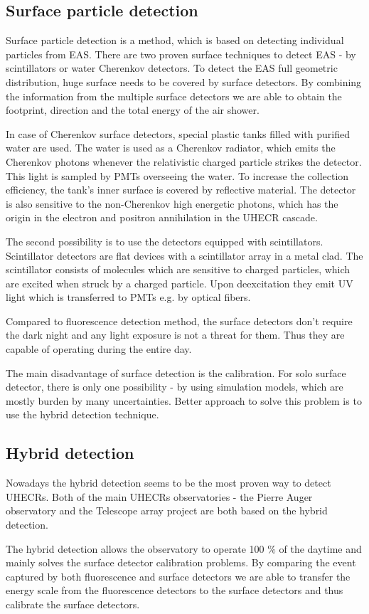 \subsection{Surface particle detection}
Surface particle detection is a method, which is based on detecting individual particles from EAS. There are two proven surface techniques to detect EAS - by scintillators or water Cherenkov detectors. To detect the EAS full geometric distribution, huge surface needs to be covered by surface detectors. By combining the information from the multiple surface detectors we are able to obtain the footprint, direction and the total energy of the air shower.
\par
In case of Cherenkov surface detectors, special plastic tanks filled with purified water are used. The water is used as a Cherenkov radiator, which emits the Cherenkov photons whenever the relativistic charged particle strikes the detector. This light is sampled by PMTs overseeing the water.
To increase the collection efficiency, the tank's inner surface is covered by reflective material. The detector is also sensitive to the non-Cherenkov high energetic photons, which has the origin in the electron and positron annihilation in the UHECR cascade.
\par
The second possibility is to use the detectors equipped with scintillators. Scintillator detectors are flat devices with a scintillator array in a metal clad. The scintillator consists of molecules which are sensitive to charged particles, which are excited when struck by a charged particle. Upon deexcitation they emit UV light which is transferred to PMTs e.g. by optical fibers.
\par
Compared to fluorescence detection method, the surface detectors don't require the dark night and any light exposure is not a threat for them. Thus they are capable of operating during the entire day. 

\par
The main disadvantage of surface detection is the calibration. For solo surface detector, there is only one possibility - by using simulation models, which are mostly burden by many uncertainties. Better approach to solve this problem is to use the hybrid detection technique.

\subsection{Hybrid detection}
Nowadays the hybrid detection seems to be the most proven way to detect UHECRs. Both of the main UHECRs observatories - the Pierre Auger observatory and the Telescope array project are both based on the hybrid detection. 
\par
The hybrid detection allows the observatory to operate 100 $\%$ of the daytime and mainly solves the surface detector calibration problems. By comparing the event captured by both fluorescence and surface detectors we are able to transfer the energy scale from the fluorescence detectors to the surface detectors and thus calibrate the surface detectors.



